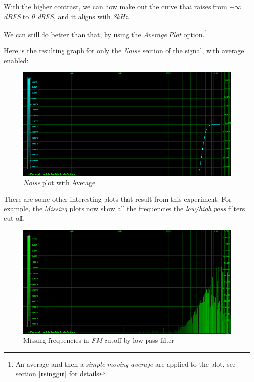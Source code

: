 \documentclass[10pt,a4paper]{report}
\begin{document}
With the higher contrast, we can now make out the curve that raises from \textit{$-\infty$ dBFS} to \textit{0 dBFS}, and it aligns with \textit{8kHz}.

We can still do better than that, by using the \textit{Average Plot} option.\footnote{An average and then a \textit{simple moving average} are applied to the plot, see section \ref{usinggui} for details}

Here is the resulting graph for only the \textit{Noise} section of the signal, with average enabled:

\begin{figure}[H]
	\centering
	\includegraphics[width=1.0\linewidth]{images/interpretation/Plot4-3-AVG-Noise.png}
	\caption[Noise Average]{\textit{Noise} plot with Average}
	\label{fig:plot4-3-avg-noise}
\end{figure}

There are some other interesting plots that result from this experiment. For example, the \textit{Missing} plots now show all the frequencies the \textit{low/high pass} filters cut off.

\begin{figure}[H]
	\centering
	\includegraphics[width=1.0\linewidth]{images/interpretation/Plot4-4-Missing-FM.png}
	\caption[Missing FM]{Missing frequencies in \textit{FM} cutoff by low pass filter}
	\label{fig:plot4-4-missing-fm}
\end{figure}
\end{document}
